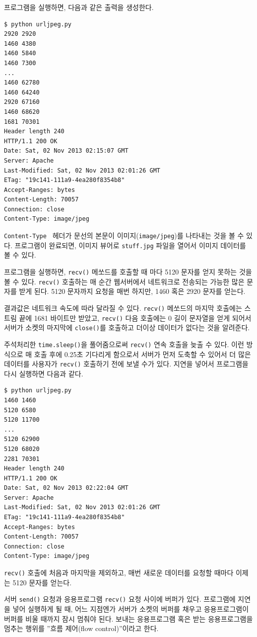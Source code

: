 프로그램을 실행하면, 다음과 같은 출력을 생성한다.

\beforeverb
\begin{verbatim}
$ python urljpeg.py 
2920 2920
1460 4380
1460 5840
1460 7300
...
1460 62780
1460 64240
2920 67160
1460 68620
1681 70301
Header length 240
HTTP/1.1 200 OK
Date: Sat, 02 Nov 2013 02:15:07 GMT
Server: Apache
Last-Modified: Sat, 02 Nov 2013 02:01:26 GMT
ETag: "19c141-111a9-4ea280f8354b8"
Accept-Ranges: bytes
Content-Length: 70057
Connection: close
Content-Type: image/jpeg
\end{verbatim}
\afterverb
%
{\tt Content-Type } 헤더가 문선의 본문이 이미지({\tt image/jpeg})를 나타내는 것을 볼 수 있다.
프로그램이 완료되면, 이미지 뷰어로 {\tt stuff.jpg} 파일을 열어서 이미지 데이터를 볼 수 있다.

프로그램을 실행하면, {\tt recv()} 메쏘드를 호출할 때 마다 5120 문자를 얻지 못하는 것을 볼 수 있다.
{\tt recv()} 호출하는 매 순간 웹서버에서 네트워크로 전송되는 가능한 많은 문자를 받게 된다. 
5120 문자까지 요청을 매번 하지만, 1460 혹은 2920 문자를 얻는다. 

결과값은 네트워크 속도에 따라 달라질 수 있다. {\tt recv()} 메쏘드의 마지막 호출에는 스트림 끝에 1681 바이트만 받았고,
{\tt recv()} 다음 호출에는 0 길이 문자열을 얻게 되어서 서버가 소켓의 마지막에 {\tt close()}를 호출하고 
더이상 데이터가 없다는 것을 알려준다.


주석처리한 {\tt time.sleep()}을 풀어줌으로써 {\tt recv()} 연속 호출을 늦출 수 있다.
이런 방식으로 매 호출 후에 0.25초 기다리게 함으로서 서버가 먼저 도축할 수 있어서 더 많은 데이터를 
사용자가 {\tt recv()} 호출하기 전에 보낼 수가 있다.
지연을 넣어서 프로그램을 다시 실행하면 다음과 같다.

\beforeverb
\begin{verbatim}
$ python urljpeg.py 
1460 1460
5120 6580
5120 11700
...
5120 62900
5120 68020
2281 70301
Header length 240
HTTP/1.1 200 OK
Date: Sat, 02 Nov 2013 02:22:04 GMT
Server: Apache
Last-Modified: Sat, 02 Nov 2013 02:01:26 GMT
ETag: "19c141-111a9-4ea280f8354b8"
Accept-Ranges: bytes
Content-Length: 70057
Connection: close
Content-Type: image/jpeg
\end{verbatim}
\afterverb
%

{\tt recv()} 호출에 처음과 마지막을 제외하고, 매번 새로운 데이터를 요청할 때마다 이제는 5120 문자를 얻는다. 

서버 {\tt send()} 요청과 응용프로그램 {\tt recv()} 요청 사이에 버퍼가 있다.
프로그램에 지연을 넣어 실행하게 될 때, 어느 지점엔가 서버가 소켓의 버퍼를 채우고 응용프로그램이 버퍼를 비울 때까지
잠시 멈춰야 된다. 보내는 응용프로그램 혹은 받는 응용프로그램을 멈추는 행위를 ''흐름 제어(flow control)''이라고 한다.

